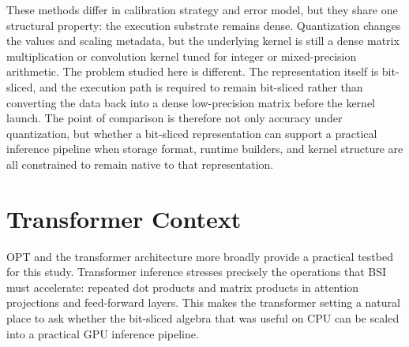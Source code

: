 These methods differ in calibration strategy and error model, but they share one structural property: the execution substrate remains dense. Quantization changes the values and scaling metadata, but the underlying kernel is still a dense matrix multiplication or convolution kernel tuned for integer or mixed-precision arithmetic. The problem studied here is different. The representation itself is bit-sliced, and the execution path is required to remain bit-sliced rather than converting the data back into a dense low-precision matrix before the kernel launch. The point of comparison is therefore not only accuracy under quantization, but whether a bit-sliced representation can support a practical inference pipeline when storage format, runtime builders, and kernel structure are all constrained to remain native to that representation.

\section{Transformer Context}
OPT \cite{opt} and the transformer architecture more broadly \cite{attention} provide a practical testbed for this study. Transformer inference stresses precisely the operations that BSI must accelerate: repeated dot products and matrix products in attention projections and feed-forward layers. This makes the transformer setting a natural place to ask whether the bit-sliced algebra that was useful on CPU can be scaled into a practical GPU inference pipeline.
